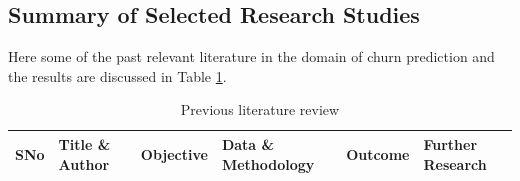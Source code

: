 \begin{landscape}
\section{Summary of Selected Research Studies}
Here some of the past relevant literature in the domain of churn prediction and the results are discussed in Table \ref{table1}.

\begin{longtable}{ | p{20pt} | p{100pt} | p{100pt} | p{150pt} | p{100pt} | p{150pt} | }
	\caption{ Previous literature review}\label{table1}\\
 	
 	\hline
 	SNo & Title \& Author & Objective &  Data \& Methodology & Outcome & Further Research\\
 	\hline
 	\endfirsthead
 	

\end{longtable}
\end{landscape}
